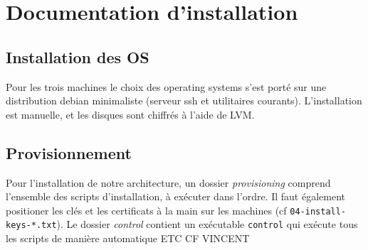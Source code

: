 \newpage

\chapter{Documentation d'installation}

\section{Installation des OS}

Pour les trois machines le choix des operating systems s'est porté sur une distribution debian minimaliste (serveur ssh et utilitaires courants). L'installation est manuelle, et les disques sont chiffrés à l'aide de LVM.

\section{Provisionnement}

Pour l'installation de notre architecture, un dossier {\it provisioning} comprend l'ensemble des scripts d'installation, à exécuter dans l'ordre. Il faut également positioner les clés et les certificats à la main sur les machines (cf {\tt 04-install-keys-*.txt}). Le dossier {\it control} contient un exécutable {\tt control} qui exécute tous les scripts de manière automatique ETC CF VINCENT
